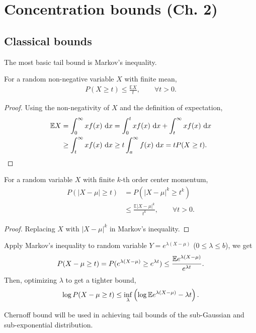 \section{Concentration bounds (Ch. 2)}
\subsection{Classical bounds}
The most basic tail bound is Markov's inequality.
\begin{theorem}
For a random non-negative variable $X$ with finite mean,
\begin{align*}
    P(X \geq t) \leq \frac{\mathbb{E} X}{t}, \qquad \forall t > 0.
\end{align*}
\end{theorem}
\begin{proof} Using the non-negativity of $X$ and the definition of expectation,
\begin{align*}
     \mathbb{E}X & =\int_0^\infty x f(x) \ \mathrm{d} x = \int _{0}^{t}xf(x)\ \mathrm{d} x+\int_{t}^{\infty }xf(x) \ \mathrm{d} x \\
     & \geq \int_{t}^{\infty }xf(x)\ \mathrm{d} x\geq t \int _{a}^{\infty}f(x)\ \mathrm{d} x  = t P(X\geq t).
\end{align*}
\end{proof}

\begin{theorem}
For a random variable $X$ with finite $k$-th order center momentum,
\begin{align*}
    P(|X - \mu| \geq t) & = P(|X - \mu|^k \geq t^k) \\
    & \leq \frac{\mathbb{E} |X - \mu|^k}{t^k}, \qquad \forall t > 0.
\end{align*}
\end{theorem}
\begin{proof} Replacing $X$ with $|X - \mu|^k$ in Markov's inequality.
\end{proof}

\begin{method} Apply Markov's inequality to random variable $Y = e^{\lambda (X - \mu)}$ ($0 \leq \lambda \leq b$), we get
\begin{align*}
    P(X - \mu \geq t) = P(e^{\lambda (X - \mu)} \geq e^{\lambda t}) \leq \frac{\mathbb{E}{e^{\lambda(X - \mu)}}}{e^{\lambda t}}.
\end{align*}
Then, optimizing $\lambda$ to get a tighter bound,
\begin{align*}
    \log  P(X - \mu \geq t) \leq \inf_{\lambda} \left( \log \mathbb{E}{e^{\lambda(X - \mu)}} - \lambda t \right).
\end{align*}
\end{method}
Chernoff bound will be used in achieving tail bounds of the sub-Gaussian and sub-exponential distribution.

